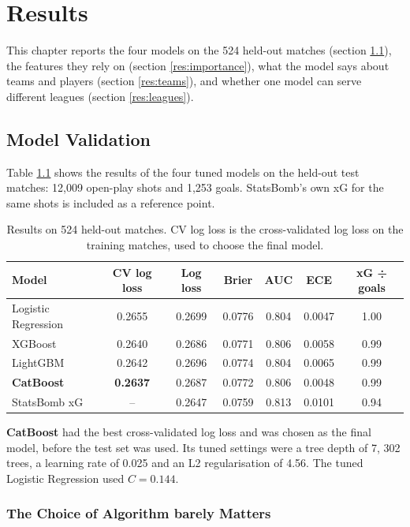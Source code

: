 \chapter{Results}\label{results}

This chapter reports the four models on the 524 held-out matches (section \ref{res:models}), the features they rely on (section \ref{res:importance}), what the model says about teams and players (section \ref{res:teams}), and whether one model can serve different leagues (section \ref{res:leagues}).

\section{Model Validation}\label{res:models}

Table \ref{tab:models} shows the results of the four tuned models on the held-out test matches: 12,009 open-play shots and 1,253 goals. StatsBomb's own xG for the same shots is included as a reference point.

\begin{table}[!h]
\centering
\small
\begin{tabular}{|l|c|c|c|c|c|c|}
\hline
\textbf{Model} & \textbf{CV log loss} & \textbf{Log loss} & \textbf{Brier} & \textbf{AUC} & \textbf{ECE} & \textbf{xG ÷ goals} \\
\hline
Logistic Regression & 0.2655 & 0.2699 & 0.0776 & 0.804 & 0.0047 & 1.00 \\
XGBoost & 0.2640 & 0.2686 & 0.0771 & 0.806 & 0.0058 & 0.99 \\
LightGBM & 0.2642 & 0.2696 & 0.0774 & 0.804 & 0.0065 & 0.99 \\
\textbf{CatBoost} & \textbf{0.2637} & 0.2687 & 0.0772 & 0.806 & 0.0048 & 0.99 \\
\hline
StatsBomb xG & -- & 0.2647 & 0.0759 & 0.813 & 0.0101 & 0.94 \\
\hline
\end{tabular}
\caption{Results on 524 held-out matches. CV log loss is the cross-validated log loss on the training matches, used to choose the final model.}
\label{tab:models}
\end{table}

\textbf{CatBoost} had the best cross-validated log loss and was chosen as the final model, before the test set was used. Its tuned settings were a tree depth of 7, 302 trees, a learning rate of 0.025 and an L2 regularisation of 4.56. The tuned Logistic Regression used $C = 0.144$.

\subsection{The Choice of Algorithm barely Matters}

